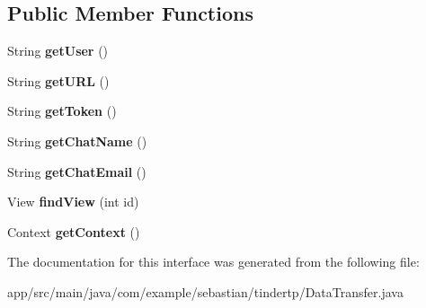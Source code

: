 \subsection*{Public Member Functions}
\begin{DoxyCompactItemize}
\item 
String {\bfseries get\+User} ()\hypertarget{interfacecom_1_1example_1_1sebastian_1_1tindertp_1_1DataTransfer_af8313575ee53c21866304be310a73035}{}\label{interfacecom_1_1example_1_1sebastian_1_1tindertp_1_1DataTransfer_af8313575ee53c21866304be310a73035}

\item 
String {\bfseries get\+U\+RL} ()\hypertarget{interfacecom_1_1example_1_1sebastian_1_1tindertp_1_1DataTransfer_a7b75a3e268b1bae7799ec41145bcea10}{}\label{interfacecom_1_1example_1_1sebastian_1_1tindertp_1_1DataTransfer_a7b75a3e268b1bae7799ec41145bcea10}

\item 
String {\bfseries get\+Token} ()\hypertarget{interfacecom_1_1example_1_1sebastian_1_1tindertp_1_1DataTransfer_a3a479c79b68eb131efaf1622eafc87cd}{}\label{interfacecom_1_1example_1_1sebastian_1_1tindertp_1_1DataTransfer_a3a479c79b68eb131efaf1622eafc87cd}

\item 
String {\bfseries get\+Chat\+Name} ()\hypertarget{interfacecom_1_1example_1_1sebastian_1_1tindertp_1_1DataTransfer_a947532ae100130f6bbd39bbce68342c7}{}\label{interfacecom_1_1example_1_1sebastian_1_1tindertp_1_1DataTransfer_a947532ae100130f6bbd39bbce68342c7}

\item 
String {\bfseries get\+Chat\+Email} ()\hypertarget{interfacecom_1_1example_1_1sebastian_1_1tindertp_1_1DataTransfer_aff1cd7c9b9bb7548b11a4f37a7083feb}{}\label{interfacecom_1_1example_1_1sebastian_1_1tindertp_1_1DataTransfer_aff1cd7c9b9bb7548b11a4f37a7083feb}

\item 
View {\bfseries find\+View} (int id)\hypertarget{interfacecom_1_1example_1_1sebastian_1_1tindertp_1_1DataTransfer_aefdfdcdf029fb73d41674fda2e4b64ed}{}\label{interfacecom_1_1example_1_1sebastian_1_1tindertp_1_1DataTransfer_aefdfdcdf029fb73d41674fda2e4b64ed}

\item 
Context {\bfseries get\+Context} ()\hypertarget{interfacecom_1_1example_1_1sebastian_1_1tindertp_1_1DataTransfer_a5a103e6dcbbdc3c617a447924eacc802}{}\label{interfacecom_1_1example_1_1sebastian_1_1tindertp_1_1DataTransfer_a5a103e6dcbbdc3c617a447924eacc802}

\end{DoxyCompactItemize}


The documentation for this interface was generated from the following file\+:\begin{DoxyCompactItemize}
\item 
app/src/main/java/com/example/sebastian/tindertp/Data\+Transfer.\+java\end{DoxyCompactItemize}

